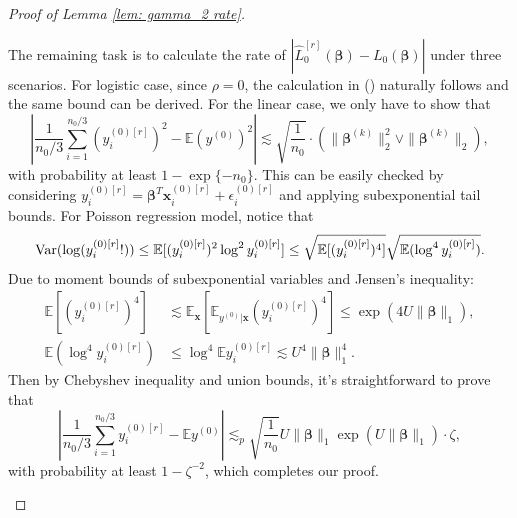 \documentclass[12pt]{article}
\newcommand*{\rom}[1]{\romannumeral #1}
\newcommand{\te}{\mathbb{E}}
\newcommand{\var}{\textup{Var}}
\newcommand{\twonorm}[1]{\|#1\|_{2}}
\newcommand{\onenorm}[1]{\|#1\|_{1}}
\newcommand{\norma}[1]{\left|#1\right|}
\newcommand{\norm}[1]{|#1|}
\newcommand{\bbeta}{\bm{\beta}}
\newcommand{\bbetak}[1]{\bm{\beta}^{(#1)}}
\newcommand{\bx}{\bm{x}}
\newcommand{\<}{\langle}
\renewcommand{\>}{\rangle}
\begin{document}
\begin{proof}[Proof of Lemma \ref{lem: gamma_2 rate}]
\begin{enumerate}[(i)]
		The remaining task is to calculate the rate of $\norm{\hat{L}_0^{[r]}(\bbeta) - L_0(\bbeta)}$ under three scenarios. For logistic case, since $\rho = 0$, the calculation in (\rom{1}) naturally follows and the same bound can be derived. For the linear case, we only have to show that
		\begin{equation}
			\norma{\frac{1}{n_0/3}\sum_{i=1}^{n_0/3}(y_i^{(0)[r]})^2 - \te (y^{(0)})^2} \lesssim \sqrt{\frac{1}{n_0}}\cdot(\twonorm{\bbetak{k}}^2 \vee \twonorm{\bbetak{k}}),
		\end{equation}
		with probability at least $1-\exp\{-n_0\}$.
		This can be easily checked by considering $y_i^{(0)[r]} = \bbeta^T\bx_i^{(0)[r]}+\epsilon_i^{(0)[r]}$ and applying subexponential tail bounds. For Poisson regression model, notice that
		\begin{equation}
			\var(\log (y_i^{(0)[r]}!)) \leq \te[(y_i^{(0)[r]})^2\log^2 y_i^{(0)[r]}] \leq \sqrt{\te[(y_i^{(0)[r]})^4]}\sqrt{\te(\log^4 y_i^{(0)[r]})}.
		\end{equation}
		Due to moment bounds of subexponential variables and Jensen's inequality:
		\begin{align}
			\te[(y_i^{(0)[r]})^4] &\lesssim \te_{\bx}\left[\te_{y^{(0)}|\bx}(y_i^{(0)[r]})^4\right] \leq \exp(4U\onenorm{\bbeta}),\\
			\te(\log^4 y_i^{(0)[r]}) &\leq \log^4 \te y_i^{(0)[r]} \lesssim U^4\onenorm{\bbeta}^4.
		\end{align}
		Then by Chebyshev inequality and union bounds, it's straightforward to prove that
		\begin{equation}
			\norma{\frac{1}{n_0/3}\sum_{i=1}^{n_0/3}y_i^{(0)[r]} - \te y^{(0)}} \lesssim_p \sqrt{\frac{1}{n_0}}U\onenorm{\bbeta}\exp(U\onenorm{\bbeta})\cdot \zeta,
		\end{equation}
		with probability at least $1-\zeta^{-2}$, which completes our proof.
		\end{enumerate}
\end{proof}


\end{document}

